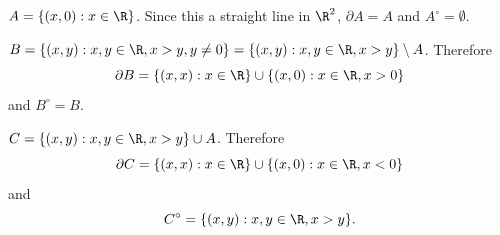 \documentclass[a4paper]{article}
\begin{document}
%
%


$A = \{(x, 0) : x \in \R\}$. Since this a straight line in $\R^2$, $\partial A = A$ and $A^\circ = \emptyset$.

$B = \{(x, y) : x, y \in \R, x > y, y \ne 0\} = \{(x, y) : x, y \in \R, x > y\} \setminus A$. Therefore \[
\partial B = \{(x, x) : x \in \R\} \cup \{(x, 0) : x \in \R, x > 0\}
\] and $B^\circ = B$.

$C = \{(x, y) : x, y \in \R, x > y\} \cup A$. Therefore \[
\partial C = \{(x, x) : x \in \R\} \cup \{(x, 0) : x \in \R, x < 0\}
\] and \[
C^\circ = \{(x, y) : x, y \in \R, x > y\}.
\]










\end{document}
